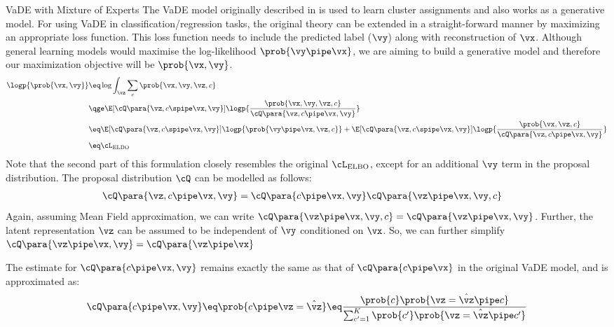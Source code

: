 \documentclass{article}
\begin{document}
\begin{psection}{VaDE with Mixture of Experts}
	The VaDE model originally described in \cite{vade} is used to learn cluster assignments and also works as a generative model. For using VaDE in classification/regression tasks, the original theory can be extended in a straight-forward manner by maximizing an appropriate loss function. This loss function needs to include the predicted label ($\vy$) along with reconstruction of $\vx$. Although general learning models would maximise the log-likelihood \ie $\prob{\vy \pipe \vx}$, we are aiming to build a generative model and therefore our maximization objective will be $\prob{\vx, \vy}$.
	\begin{align*}
		\logp{\prob{\vx, \vy}} &\eq \log{\int_\vz \sum_c\prob{\vx, \vy, \vz, c}} \\
		&\qge \E[\cQ\para{\vz, c \spipe \vx, \vy}]{\logp{\frac{\prob{\vx, \vy, \vz, c}}{\cQ\para{\vz, c \pipe \vx, \vy}}}}\\
		&\eq \E[\cQ\para{\vz, c \spipe \vx, \vy}]{\logp{\prob{\vy \pipe \vx, \vz, c}}} + \E[\cQ\para{\vz, c \spipe \vx, \vy}]{\logp{\frac{\prob{\vx, \vz, c}}{\cQ\para{\vz, c \pipe \vx, \vy}}}} \\
		&\eq \cL_{\text{ELBO}}
	\end{align*}
	Note that the second part of this formulation closely resembles the original $\cL_{\text{ELBO}}$, except for an additional $\vy$ term in the proposal distribution. The proposal distribution $\cQ$ can be modelled as follows:
	\begin{align*}
		\cQ\para{\vz, c \pipe \vx, \vy} &= \cQ\para{c \pipe \vx, \vy}\cQ\para{\vz \pipe \vx, \vy, c}
	\end{align*}
	Again, assuming Mean Field approximation, we can write $\cQ\para{\vz \pipe \vx, \vy, c} = \cQ\para{\vz \pipe \vx, \vy}$. Further, the latent representation $\vz$ can be assumed to be independent of $\vy$ conditioned on $\vx$. So, we can further simplify $ \cQ\para{\vz \pipe \vx, \vy} = \cQ\para{\vz \pipe \vx}$

	The estimate for $\cQ\para{c \pipe \vx, \vy}$ remains exactly the same as that of $\cQ\para{c \pipe \vx}$ in the original VaDE model, and is approximated as:
	\begin{align*}
		\cQ\para{c \pipe \vx, \vy} \eq \prob{c \pipe \vz = \hat{\vz}} \eq \frac{\prob{c} \prob{\vz = \hat{\vz} \pipe c}}{\sum_{c' = 1}^{K} \prob{c'} \prob{\vz = \hat{\vz} \pipe c'}}
	\end{align*}


\end{psection}
\end{document}
